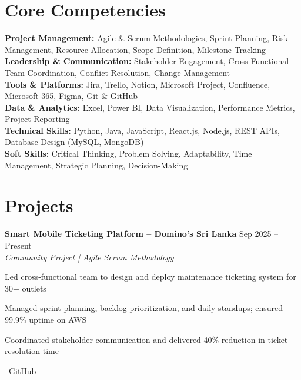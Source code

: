 \documentclass[letterpaper,10pt]{article}
\newenvironment{resume_list}{
  \vspace{-2pt}
  \begin{itemize}[itemsep=1pt, leftmargin=14pt]
}{
  \end{itemize}\vspace{-3pt}
}
\begin{document}
\section{Core Competencies}
\vspace{-1pt}

\textbf{Project Management:} Agile \& Scrum Methodologies, Sprint Planning, Risk Management, Resource Allocation, Scope Definition, Milestone Tracking\\[2pt]
\textbf{Leadership \& Communication:} Stakeholder Engagement, Cross-Functional Team Coordination, Conflict Resolution, Change Management\\[2pt]
\textbf{Tools \& Platforms:} Jira, Trello, Notion, Microsoft Project, Confluence, Microsoft 365, Figma, Git \& GitHub\\[2pt]
\textbf{Data \& Analytics:} Excel, Power BI, Data Visualization, Performance Metrics, Project Reporting\\[2pt]
\textbf{Technical Skills:} Python, Java, JavaScript, React.js, Node.js, REST APIs, Database Design (MySQL, MongoDB)\\[2pt]
\textbf{Soft Skills:} Critical Thinking, Problem Solving, Adaptability, Time Management, Strategic Planning, Decision-Making

\section{Projects}
\vspace{-1pt}

\textbf{Smart Mobile Ticketing Platform – Domino's Sri Lanka} \hfill Sep 2025 – Present\\
\textit{Community Project | Agile Scrum Methodology}\\
\begin{resume_list}
  \item Led cross-functional team to design and deploy maintenance ticketing system for 30+ outlets
  \item Managed sprint planning, backlog prioritization, and daily standups; ensured 99.9\% uptime on AWS
  \item Coordinated stakeholder communication and delivered 40\% reduction in ticket resolution time
  \item \faGithub~\href{https://github.com/fixpoint-tech}{GitHub}
\end{resume_list}
\end{document}
